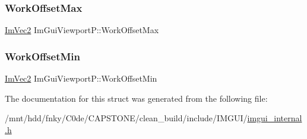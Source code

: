 \mbox{\label{structImGuiViewportP_a7585ac0a2cd88cf8ff77a05567053f2d}} 
\subsubsection{\texorpdfstring{Work\+Offset\+Max}{WorkOffsetMax}}
{\footnotesize\ttfamily \hyperlink{structImVec2}{Im\+Vec2} Im\+Gui\+Viewport\+P\+::\+Work\+Offset\+Max}

\mbox{\label{structImGuiViewportP_aa01d12e912859fd6edf710ef377ed960}} 
\subsubsection{\texorpdfstring{Work\+Offset\+Min}{WorkOffsetMin}}
{\footnotesize\ttfamily \hyperlink{structImVec2}{Im\+Vec2} Im\+Gui\+Viewport\+P\+::\+Work\+Offset\+Min}



The documentation for this struct was generated from the following file\+:\begin{DoxyCompactItemize}
\item 
/mnt/hdd/fnky/\+C0de/\+C\+A\+P\+S\+T\+O\+N\+E/clean\+\_\+build/include/\+I\+M\+G\+U\+I/\hyperlink{imgui__internal_8h}{imgui\+\_\+internal.\+h}\end{DoxyCompactItemize}
